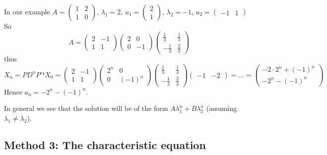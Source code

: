 \documentclass[english]{lbscript}
\begin{document}
\begin{example}{}{}
  In our example \(A=\begin{pmatrix} 1  & 2 \\ 1  & 0 \end{pmatrix}\), \(𝜆_{1}=2\), \(u_1= \begin{pmatrix}
    2 \\ 1\end{pmatrix}\),
  \(𝜆_{2}=-1\), \(u_2=\begin{pmatrix} -1&1\end{pmatrix}\)\\
  So
  \begin{equation}
    \label{eq:66}
    A = \begin{pmatrix} 2  & -1 \\ 1  & 1 \end{pmatrix}
    \begin{pmatrix} 2  & 0 \\ 0  & -1 \end{pmatrix}
    \begin{pmatrix} \frac{1}{3}  & \frac{1}{3} \\ -\frac{1}{3}  & \frac{2}{3} \end{pmatrix}
  \end{equation}
  thus
  \begin{equation}
    \label{eq:67}
    X_{n}= PD^{n}P⁻¹ X_0 = \begin{pmatrix} 2  & -1 \\ 1  & 1 \end{pmatrix}
    \begin{pmatrix} 2^{n}  & 0 \\ 0  & (-1)^{n} \end{pmatrix}
    \begin{pmatrix} \frac{1}{3}  & \frac{1}{3} \\ -\frac{1}{3}  & \frac{2}{3} \end{pmatrix} \begin{pmatrix} -1 & -2 \end{pmatrix} = \dots =
    \begin{pmatrix} -2⋅2^{n} + (-1)^{n} \\ -2^{n} - (-1)^{n} \end{pmatrix}
  \end{equation}
  Hence \(a_n=-2^{n}-(-1)^{n}\).

  In general we see that the solution will be of the form \(A 𝜆_{1}^{n}+B 𝜆_{2}^{n}\) (assuming \(𝜆_{1}≠𝜆_{2}\)).
\end{example}

\subsection{Method 3: The characteristic equation}
\label{sec:meth-3:-char}
\end{document}
